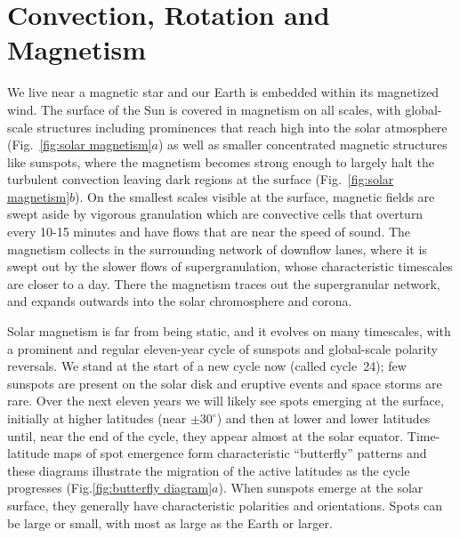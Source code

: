 


\chapter{Convection, Rotation and Magnetism}
\label{chapter:introduction}

We live near a magnetic star and our Earth is embedded within its
magnetized wind.  The surface of the Sun is covered in magnetism on all
scales, with global-scale structures including prominences that reach
high into the solar atmosphere (Fig.~\ref{fig:solar magnetism}$a$) as
well as smaller concentrated magnetic structures like sunspots, where
the magnetism becomes strong enough to largely halt the turbulent
convection leaving dark regions at the surface (Fig.~\ref{fig:solar
  magnetism}$b$).  On the smallest scales visible at the surface,
magnetic fields are swept aside by vigorous granulation which
are convective cells that overturn every 10-15 minutes and have flows
that are near the speed of sound.  The magnetism collects in
the surrounding network of downflow lanes, where it is swept out by
the slower flows of supergranulation, whose characteristic timescales
are closer to a day.  There the magnetism traces out the supergranular
network, and expands outwards into the solar chromosphere and corona.

Solar magnetism is far from being static, and it evolves on many timescales, with a
prominent and regular eleven-year cycle of sunspots and global-scale
polarity reversals. We stand at the start of a new cycle now (called cycle~24); few
sunspots are present on the solar disk and eruptive events and space
storms are rare.  Over the next eleven years we will likely see spots
emerging at the surface, initially at higher latitudes (near
$\pm30^\circ$) and then at lower and lower latitudes until, near the
end of the cycle, they appear almost at the solar
equator. Time-latitude maps of spot emergence form characteristic
``butterfly'' patterns and these diagrams illustrate the migration of
the active latitudes as the cycle progresses (Fig.\ref{fig:butterfly
  diagram}$a$). When sunspots emerge at the solar surface, they
generally have characteristic polarities and orientations.  Spots can
be large or small, with most as large as the Earth or larger.   


